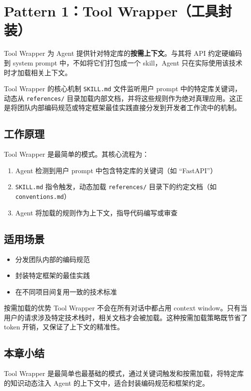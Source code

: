 \section{Pattern 1：Tool Wrapper（工具封装）}

Tool Wrapper 为 Agent 提供针对特定库的\textbf{按需上下文}。与其将 API 约定硬编码到 system prompt 中，不如将它们打包成一个 skill，Agent 只在实际使用该技术时才加载相关上下文。

\begin{importantbox}{Tool Wrapper 的核心机制}
\texttt{SKILL.md} 文件监听用户 prompt 中的特定库关键词，动态从 \texttt{references/} 目录加载内部文档，并将这些规则作为绝对真理应用。这正是将团队内部编码规范或特定框架最佳实践直接分发到开发者工作流中的机制。
\end{importantbox}

\subsection{工作原理}

Tool Wrapper 是最简单的模式。其核心流程为：

\begin{enumerate}
    \item Agent 检测到用户 prompt 中包含特定库的关键词（如 ``FastAPI''）
    \item \texttt{SKILL.md} 指令触发，动态加载 \texttt{references/} 目录下的约定文档（如 \texttt{conventions.md}）
    \item Agent 将加载的规则作为上下文，指导代码编写或审查
\end{enumerate}

\subsection{适用场景}

\begin{itemize}
    \item 分发团队内部的编码规范
    \item 封装特定框架的最佳实践
    \item 在不同项目间复用一致的技术标准
\end{itemize}

\begin{knowledgebox}{按需加载的优势}
Tool Wrapper 不会在所有对话中都占用 context window。只有当用户的请求涉及特定技术栈时，相关文档才会被加载。这种按需加载策略既节省了 token 开销，又保证了上下文的精准性。
\end{knowledgebox}

\subsection{本章小结}

Tool Wrapper 是最简单也最基础的模式，通过关键词触发和按需加载，将特定库的知识动态注入 Agent 的上下文中，适合封装编码规范和框架约定。

